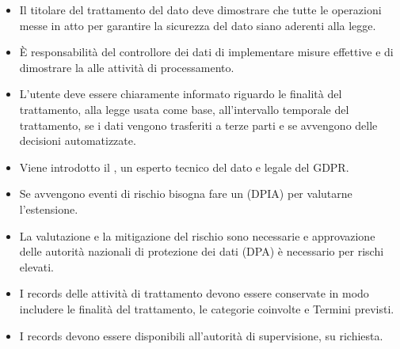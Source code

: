 \begin{itemize}
  \item Il titolare del trattamento del dato deve dimostrare che tutte le operazioni messe in atto per garantire la sicurezza del dato siano aderenti alla legge. 
  \item È responsabilità del controllore dei dati di implementare misure effettive e di dimostrare la  alle attività di processamento. 
  \item L'utente deve essere chiaramente informato riguardo le finalità del trattamento, alla legge usata come base, all'intervallo temporale del trattamento, se i dati vengono trasferiti a terze parti e se avvengono delle decisioni automatizzate. 
  \item Viene introdotto il , un esperto tecnico del dato e legale del GDPR. 
  \item Se avvengono eventi di rischio bisogna fare un  (DPIA) per valutarne l'estensione. 
  \item La valutazione e la mitigazione del rischio sono necessarie e approvazione delle autorità nazionali di protezione dei dati (DPA) è necessario per rischi elevati. 
  \item I records delle attività di trattamento devono essere conservate in modo includere le finalità del trattamento, le categorie coinvolte e Termini previsti.  
  \item I records devono essere disponibili all'autorità di supervisione, su richiesta.
\end{itemize}




